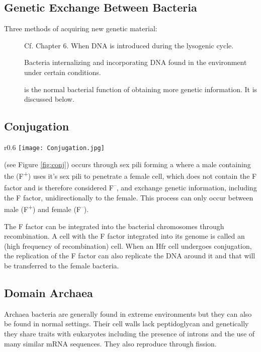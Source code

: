 \documentclass[../Bio_chemistryReview.tex]{subfiles}
\begin{document}
\subsection{Genetic Exchange Between Bacteria}
Three methods of acquiring new genetic material:
\begin{description}
    \item[] Cf. Chapter 6. When DNA is introduced during
        the lysogenic cycle.
    \item[] Bacteria internalizing and incorporating DNA
        found in the environment under certain conditions.
    \item[] is the normal bacterial function of obtaining
        more genetic information. It is discussed below.
\end{description}

\subsection{Conjugation}
\begin{wrapfigure}[21]{r}{0.6\textwidth}
    \centering
    \vspace{-11pt}
    \texttt{[image: Conjugation.jpg]}
    \vspace{-5pt}
    \caption{Conjugation}
    \label{fig:conj}
\end{wrapfigure}
 (see Figure \ref{fig:conj}) occurs through sex pili forming a
 where a male containing the  (F\textsuperscript{+}) uses it's sex pili to penetrate a female cell,
which does not contain the F factor and is therefore considered
F\textsuperscript{--}, and exchange genetic information, including the F factor,
unidirectionally to the female. This process can only occur between male
(F\textsuperscript{+}) and female (F\textsuperscript{--}).\par


The F factor can be integrated into the bacterial chromosomes through
recombination. A cell with the F factor integrated into its genome is called an
 (high frequency of recombination) cell. When an Hfr
cell undergoes conjugation, the replication of the F factor can also replicate
the DNA around it and that will be transferred to the female bacteria.

\subsection{Domain Archaea}
Archaea bacteria are generally found in extreme environments but they can also
be found in normal settings. Their cell walls lack peptidoglycan and genetically
they share traits with eukaryotes including the presence of introns and the use
of many similar mRNA sequences. They also reproduce through fission.
\end{document}

